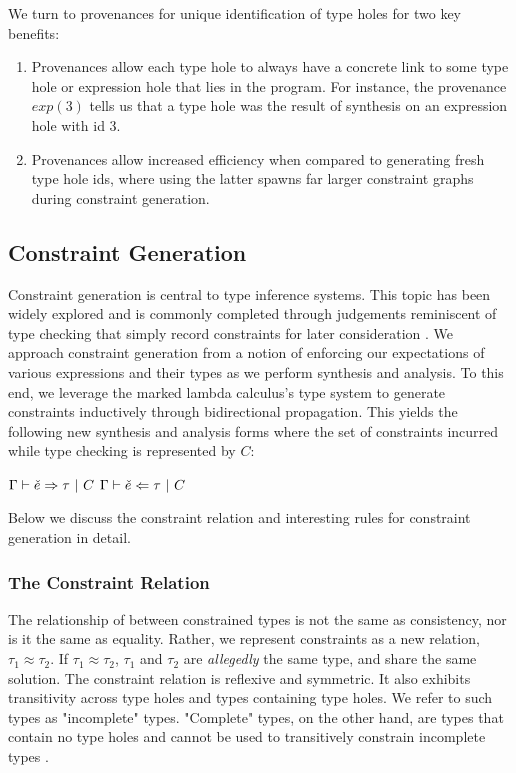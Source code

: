 We turn to provenances for unique identification of type holes for two key benefits:
\begin{enumerate}
    \item Provenances allow each type hole to always have a concrete link to some type hole or expression hole that lies in the program. For instance, the provenance $exp(3)$ tells us that a type hole was the result of synthesis on an expression hole with id 3.
    \item Provenances allow increased efficiency when compared to generating fresh type hole ids, where using the latter spawns far larger constraint graphs during constraint generation.
\end{enumerate}

\subsection{Constraint Generation}
Constraint generation is central to type inference systems. This topic has been widely explored and is commonly completed through judgements reminiscent of type checking that simply record constraints for later consideration \cite{TAPL}. We approach constraint generation from a notion of enforcing our expectations of various expressions and their types as we perform synthesis and analysis. To this end, we leverage the marked lambda calculus's type system to generate constraints inductively through bidirectional propagation. This yields the following new synthesis and analysis forms where the set of constraints incurred while type checking is represented by $C$:
\begin{center}
    $\Gamma \vdash \check{e} \Rightarrow \tau ~|~ C$ \hspace{3cm} $\Gamma \vdash \check{e} \Leftarrow \tau ~|~ C$
\end{center}
Below we discuss the constraint relation and interesting rules for constraint generation in detail.

\subsubsection{The Constraint Relation}
The relationship of between constrained types is not the same as consistency, nor is it the same as equality. Rather, we represent constraints as a new relation, $\tau_1 \approx \tau_2$. If $\tau_1 \approx \tau_2$, $\tau_1$ and $\tau_2$ are \textit{allegedly} the same type, and share the same solution. The constraint relation is reflexive and symmetric. It also exhibits transitivity across type holes and types containing type holes. We refer to such types as "incomplete" types. "Complete" types, on the other hand, are types that contain no type holes and cannot be used to transitively constrain incomplete types \cite{HazelnutPOPL}.


